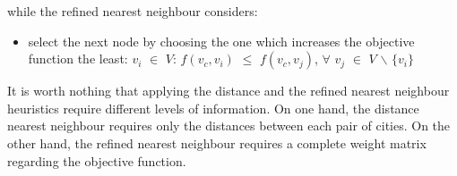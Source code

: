 while the refined nearest neighbour considers:


\begin{itemize}
    \item select the next node by choosing the one which increases the objective function the least: \newline
    $v_i$ $\in$ $V$: $f(v_c, v_i)$ $\leq$ $f(v_c, v_j)$,
    $\forall$ $v_j$ $\in$ $V$ $\backslash$ $\{v_i\}$   
\end{itemize}

It is worth nothing that applying the distance and the refined nearest neighbour heuristics require different levels of information. On one hand, the distance nearest neighbour requires only the distances between each pair of cities. On the other hand, the refined nearest neighbour requires a complete weight matrix regarding the objective function.



